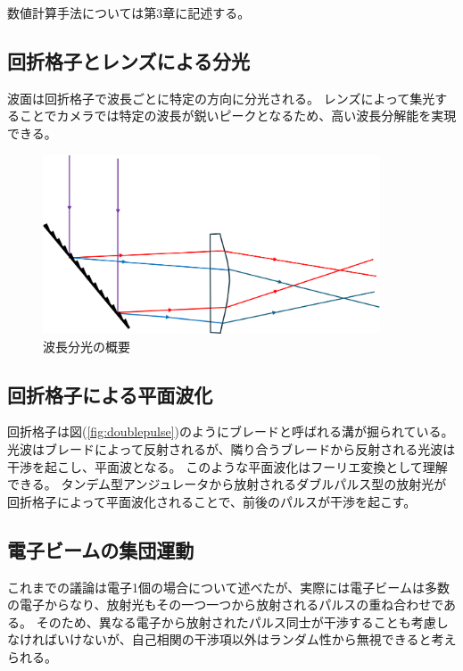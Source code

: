 \documentclass[a4paper,11pt,uplatex]{jsbook}
\begin{document}
数値計算手法については第3章に記述する。
\subsection{回折格子とレンズによる分光}\label{sec:grating}
波面は回折格子で波長ごとに特定の方向に分光される。
レンズによって集光することでカメラでは特定の波長が鋭いピークとなるため、高い波長分解能を実現できる。
\begin{figure}[h]
  \centering
  \includegraphics[width=10cm]{image/2-dispersion.png}
  \caption{波長分光の概要}
\end{figure}
\subsection{回折格子による平面波化}\label{sec:grating2}
回折格子は図(\ref{fig:doublepulse})のようにブレードと呼ばれる溝が掘られている。
光波はブレードによって反射されるが、隣り合うブレードから反射される光波は干渉を起こし、平面波となる。
このような平面波化はフーリエ変換として理解できる。
タンデム型アンジュレータから放射されるダブルパルス型の放射光が回折格子によって平面波化されることで、前後のパルスが干渉を起こす。
\subsection{電子ビームの集団運動}
これまでの議論は電子1個の場合について述べたが、実際には電子ビームは多数の電子からなり、放射光もその一つ一つから放射されるパルスの重ね合わせである。
そのため、異なる電子から放射されたパルス同士が干渉することも考慮しなければいけないが、自己相関の干渉項以外はランダム性から無視できると考えられる。
\end{document}
